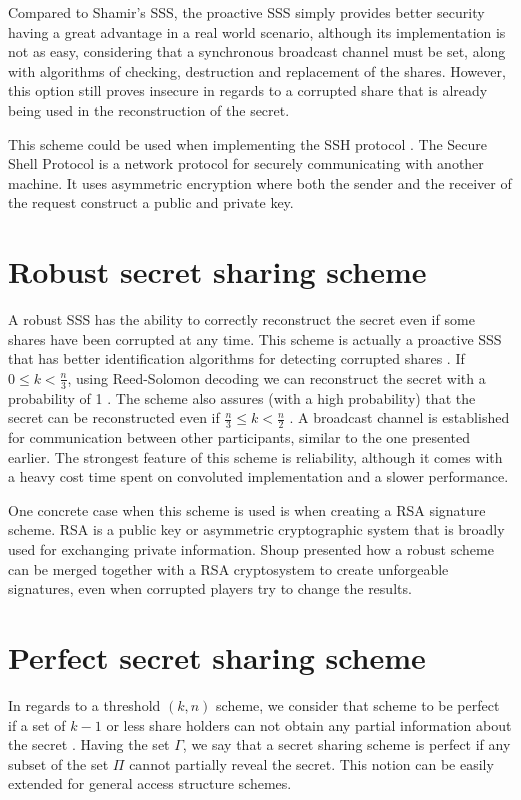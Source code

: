 \documentclass[12pt, a4paper, oneside]{book}
\begin{document}
    Compared to Shamir's SSS, the proactive SSS simply provides better security having a great advantage in a real world scenario, although its implementation is not as easy, considering that a synchronous broadcast channel must be set, along with algorithms of checking, destruction and replacement of the shares. However, this option still proves insecure in regards to a corrupted share that is already being used in the reconstruction of the secret.
    
    This scheme could be used when implementing the SSH protocol \cite{DistiSSH}. The Secure Shell Protocol is a network protocol for securely communicating with another machine. It uses asymmetric encryption where both the sender and the receiver of the request construct a public and private key.
    \\
    \section{Robust secret sharing scheme}
    A robust SSS has the ability to correctly reconstruct the secret even if some shares have been corrupted at any time. This scheme is actually a proactive SSS that has better identification algorithms for detecting corrupted shares \cite{PSSS}. If $0{\leq}k{<}\tfrac{n}{3}$, using Reed-Solomon decoding we can reconstruct the secret with a probability of 1 \cite{Reed-Solomon}. The scheme also assures (with a high probability) that the secret can be reconstructed even if $\tfrac{n}{3}{\leq}k{<}\tfrac{n}{2}$ \cite{Rabin1994RobustSO}. A broadcast channel is established for communication between other participants, similar to the one presented earlier. The strongest feature of this scheme is reliability, although it comes with a heavy cost time spent on convoluted implementation and a slower performance.
    
    One concrete case when this scheme is used is when creating a RSA signature scheme. RSA is a public key or asymmetric cryptographic system that is broadly used for exchanging private information. Shoup \cite{PracticalThresholdS} presented how a robust scheme can be merged together with a RSA cryptosystem to create unforgeable signatures, even when corrupted players try to change the results.
    \section{Perfect secret sharing scheme}
    In regards to a threshold $ (k, n) $ scheme, we consider that scheme to be perfect if a set of $k{-}1 $ or less share holders can not obtain any partial information about the secret \cite{CombATS}.
    Having the set $\Gamma$, we say that a secret sharing scheme is perfect if any subset of the set $\Pi$ cannot partially reveal the secret. This notion can be easily extended for general access structure schemes.
    
\end{document}
